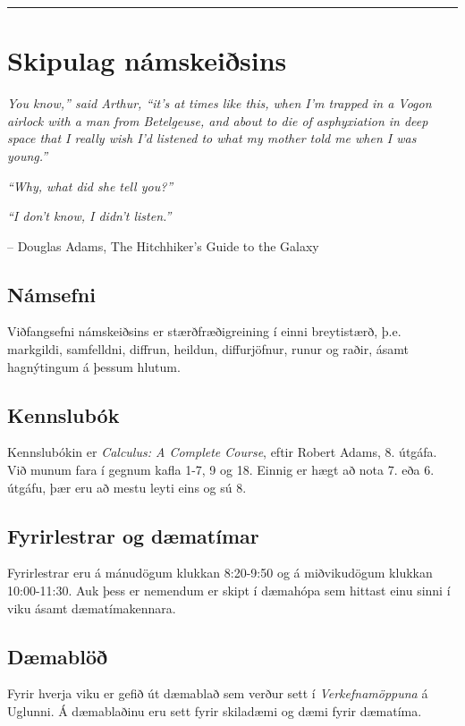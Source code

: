 \documentclass[b5paper,10pt,icelandic]{sphinxmanual}
\begin{document}
\bigskip\hrule{}\bigskip

\newpage

\section{Skipulag námskeiðsins}
\label{vidauki:skipulag-namskeisins}
\emph{You know,'' said Arthur, ``it's at times like this, when I'm trapped in a
Vogon airlock with a man from Betelgeuse, and about to die of asphyxiation
in deep space that I really wish I'd listened to what my mother told me when I was young.''}

\emph{``Why, what did she tell you?''}

\emph{``I don't know, I didn't listen.”}

-- Douglas Adams, The Hitchhiker's Guide to the Galaxy


\subsection{Námsefni}
\label{vidauki:namsefni}
Viðfangsefni námskeiðsins er stærðfræðigreining í einni
breytistærð, þ.e. markgildi, samfelldni, diffrun, heildun, diffurjöfnur,
runur og raðir, ásamt hagnýtingum á þessum hlutum.


\subsection{Kennslubók}
\label{vidauki:kennslubok}
Kennslubókin er \emph{Calculus: A Complete Course}, eftir
Robert Adams, 8. útgáfa. Við munum fara í gegnum kafla 1-7, 9 og
18. Einnig er hægt að nota 7. eða 6. útgáfu, þær eru að mestu leyti eins og sú 8.


\subsection{Fyrirlestrar og dæmatímar}
\label{vidauki:fyrirlestrar-og-daematimar}
Fyrirlestrar eru á mánudögum klukkan 8:20-9:50 og á miðvikudögum
klukkan 10:00-11:30. Auk þess er nemendum er skipt
í dæmahópa sem hittast einu sinni í viku ásamt dæmatímakennara.


\subsection{Dæmablöð}
\label{vidauki:daemablo}
Fyrir hverja viku er gefið út dæmablað sem
verður sett í \emph{Verkefnamöppuna} á Uglunni. Á dæmablaðinu eru sett fyrir
skiladæmi og dæmi fyrir dæmatíma.
\end{document}
